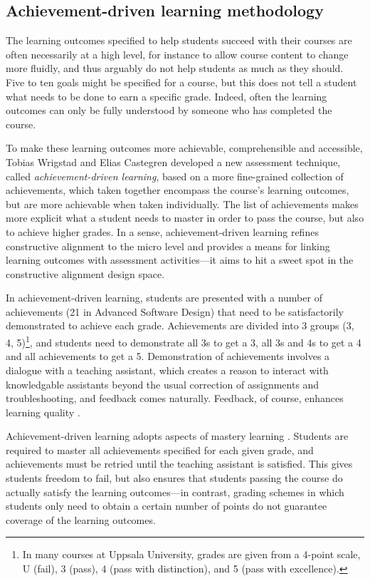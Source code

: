 \documentclass[sigconf]{acmart}
\begin{document}
\hypertarget{sec:achievement-driven}{%
\subsection{Achievement-driven learning
methodology}\label{sec:achievement-driven}}

The learning outcomes specified to help students succeed with their
courses \citep{biggs1996} are often necessarily at a high level, for
instance to allow course content to change more fluidly, and thus
arguably do not help students as much as they should. Five to ten goals
might be specified for a course, but this does not tell a student what
needs to be done to earn a specific grade. Indeed, often the learning
outcomes can only be fully understood by someone who has completed the
course.

To make these learning outcomes more achievable, comprehensible and
accessible, Tobias Wrigstad and Elias Castegren
\citep{wrigstad2017mastery} developed a new assessment technique, called
\textit{achievement-driven learning}, based on a more fine-grained
collection of achievements, which taken together encompass the course's
learning outcomes, but are more achievable when taken individually. The
list of achievements makes more explicit what a student needs to master
in order to pass the course, but also to achieve higher grades. In a
sense, achievement-driven learning refines constructive alignment to the
micro level and provides a means for linking learning outcomes with
assessment activities---it aims to hit a sweet spot in the constructive
alignment design space.

In achievement-driven learning, students are presented with a number of
achievements (21 in Advanced Software Design) that need to be
satisfactorily demonstrated to achieve each grade. Achievements are
divided into 3 groups (3, 4,
5)\footnote{In many courses at Uppsala University, grades are given from a 4-point scale, U (fail),
3 (pass), 4 (pass with distinction), and 5 (pass with excellence).}, and
students need to demonstrate all 3s to get a 3, all 3s and 4s to get a 4
and all achievements to get a 5. Demonstration of achievements involves
a dialogue with a teaching assistant, which creates a reason to interact
with knowledgable assistants beyond the usual correction of assignments
and troubleshooting, and feedback comes naturally. Feedback, of course,
enhances learning quality \citep{hattie2012}.

Achievement-driven learning adopts aspects of mastery learning
\citep{bloom1974}. Students are required to master all achievements
specified for each given grade, and achievements must be retried until
the teaching assistant is satisfied. This gives students freedom to
fail, but also ensures that students passing the course do actually
satisfy the learning outcomes---in contrast, grading schemes in which
students only need to obtain a certain number of points do not guarantee
coverage of the learning outcomes.
\end{document}
